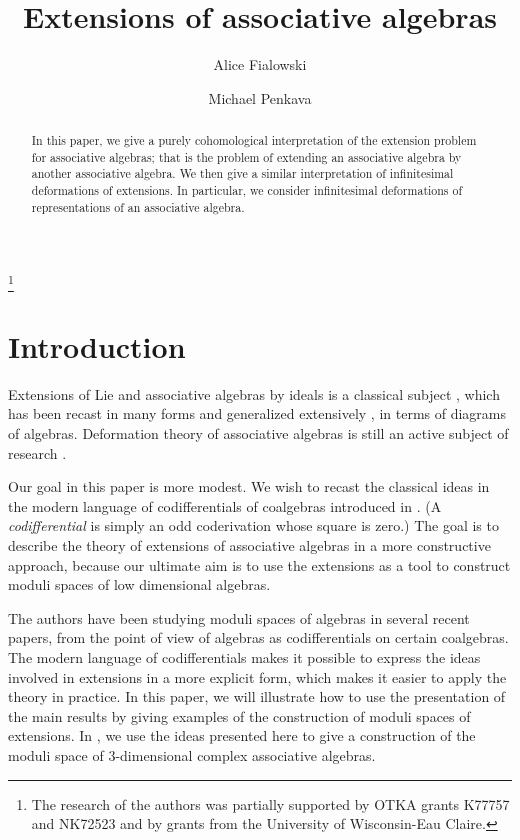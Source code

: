 \documentclass[12pt]{amsart}
\author{Alice Fialowski}
\author{Michael Penkava}
\theoremstyle{definition}
\begin{document}
\setlength{\multlinegap}{0pt}
\title{Extensions  of associative algebras}
\address{}\email{}
\thanks{The research of the authors was partially supported by
 OTKA grants K77757 and NK72523 and by grants
 from the University of Wisconsin-Eau Claire.}\subjclass{}\keywords{}
\begin{abstract}
In this paper, we give a purely cohomological interpretation of the
extension problem for associative algebras; that is the problem of
extending an associative algebra by another associative algebra. We
then give a similar interpretation of infinitesimal deformations of
extensions. In particular, we consider infinitesimal deformations of
representations of an associative algebra.
\end{abstract}
\maketitle

\section{Introduction}
Extensions of Lie and associative algebras by ideals is a classical
subject \cite{ce,mac}, which has been recast in many forms and
generalized extensively \cite{GS2,GGS}, in terms of diagrams of
algebras. Deformation theory of associative algebras is still an
active subject of research \cite{bez-gin}.

Our goal in this paper is more modest. We wish to recast the
classical ideas in the modern language of codifferentials of coalgebras
introduced
in \cite{sta4}. (A \emph{codifferential} is simply an odd coderivation whose
square is zero.)
The goal is to describe the theory of extensions of
associative algebras in a more constructive approach, because our
ultimate aim is to use the extensions as a tool to construct moduli
spaces of low dimensional algebras.

The authors have been studying moduli spaces of algebras in several
recent papers, from the point of view of algebras as codifferentials
on certain coalgebras. The modern language of codifferentials makes
it possible to express the ideas involved in extensions in a more
explicit form, which makes it easier to apply the theory in
practice. In this paper, we will illustrate how to use the
presentation of the main results by giving examples of the
construction of moduli spaces of extensions. In \cite{fp12}, we use
the ideas presented here to give a construction of the moduli space
of 3-dimensional complex associative algebras.
\end{document}
